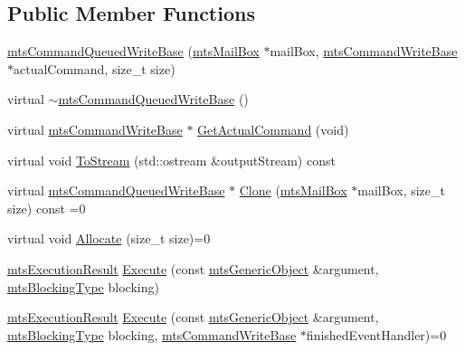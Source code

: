 \subsection*{Public Member Functions}
\begin{DoxyCompactItemize}
\item 
\hyperlink{classmts_command_queued_write_base_a3acce98115e1e2ebc41079f22ed1b30e}{mts\-Command\-Queued\-Write\-Base} (\hyperlink{classmts_mail_box}{mts\-Mail\-Box} $\ast$mail\-Box, \hyperlink{classmts_command_write_base}{mts\-Command\-Write\-Base} $\ast$actual\-Command, size\-\_\-t size)
\item 
virtual \hyperlink{classmts_command_queued_write_base_a67b0676e10efe628b44930d9b5a1f12f}{$\sim$mts\-Command\-Queued\-Write\-Base} ()
\item 
virtual \hyperlink{classmts_command_write_base}{mts\-Command\-Write\-Base} $\ast$ \hyperlink{classmts_command_queued_write_base_a7e97a8a3bc60fca2ba15bd335a8838b6}{Get\-Actual\-Command} (void)
\item 
virtual void \hyperlink{classmts_command_queued_write_base_a8c3b9a68b2f3067d1e4974f963fd9d23}{To\-Stream} (std\-::ostream \&output\-Stream) const 
\item 
virtual \hyperlink{classmts_command_queued_write_base}{mts\-Command\-Queued\-Write\-Base} $\ast$ \hyperlink{classmts_command_queued_write_base_af5ad182c80a9c5660d9da1afa425f417}{Clone} (\hyperlink{classmts_mail_box}{mts\-Mail\-Box} $\ast$mail\-Box, size\-\_\-t size) const =0
\item 
virtual void \hyperlink{classmts_command_queued_write_base_a4c913b692d849b9aa47f3c9ea235cd8f}{Allocate} (size\-\_\-t size)=0
\item 
\hyperlink{classmts_execution_result}{mts\-Execution\-Result} \hyperlink{classmts_command_queued_write_base_a6d7fa71986aac29927898583c4c1f1f9}{Execute} (const \hyperlink{classmts_generic_object}{mts\-Generic\-Object} \&argument, \hyperlink{mts_forward_declarations_8h_ad7426ccb6c883bc780d0ee197dddcbe7}{mts\-Blocking\-Type} blocking)
\item 
\hyperlink{classmts_execution_result}{mts\-Execution\-Result} \hyperlink{classmts_command_queued_write_base_af7ee7e7dd5d775d48ff191661ae7c376}{Execute} (const \hyperlink{classmts_generic_object}{mts\-Generic\-Object} \&argument, \hyperlink{mts_forward_declarations_8h_ad7426ccb6c883bc780d0ee197dddcbe7}{mts\-Blocking\-Type} blocking, \hyperlink{classmts_command_write_base}{mts\-Command\-Write\-Base} $\ast$finished\-Event\-Handler)=0
\item 

\end{DoxyCompactItemize}
